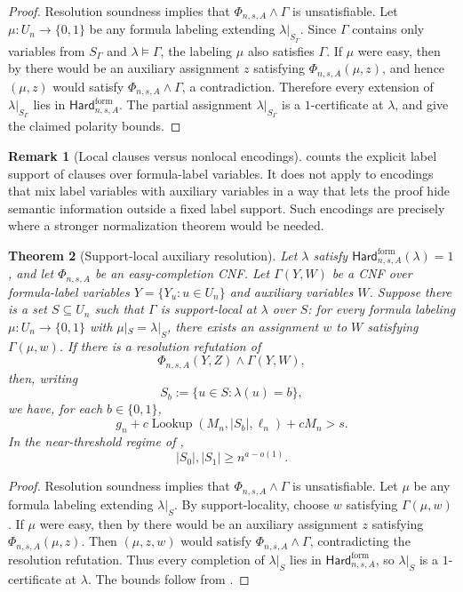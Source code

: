 \documentclass[11pt]{article}
\newtheorem{theorem}{Theorem}[section]
\theoremstyle{definition}
\newtheorem{remark}[theorem]{Remark}
\newcommand{\bits}{\{0,1\}}
\newcommand{\Lookup}{\operatorname{Lookup}}
\newcommand{\HardF}{\mathsf{Hard}^{\mathrm{form}}}
\begin{document}
\begin{proof}
Resolution soundness implies that \(\Phi_{n,s,A}\wedge\Gamma\) is unsatisfiable.  Let \(\mu:U_n\to\bits\) be any formula labeling extending \(\lambda|_{S_\Gamma}\).  Since \(\Gamma\) contains only variables from \(S_\Gamma\) and \(\lambda\models\Gamma\), the labeling \(\mu\) also satisfies \(\Gamma\).  If \(\mu\) were easy, then by  there would be an auxiliary assignment \(z\) satisfying \(\Phi_{n,s,A}(\mu,z)\), and hence \((\mu,z)\) would satisfy \(\Phi_{n,s,A}\wedge\Gamma\), a contradiction.  Therefore every extension of \(\lambda|_{S_\Gamma}\) lies in \(\HardF_{n,s,A}\).  The partial assignment \(\lambda|_{S_\Gamma}\) is a \(1\)-certificate at \(\lambda\), and  give the claimed polarity bounds.
\end{proof}

\begin{remark}[Local clauses versus nonlocal encodings]\label{rem:local-clause-scope}
 counts the explicit label support of clauses over formula-label variables.  It does not apply to encodings that mix label variables with auxiliary variables in a way that lets the proof hide semantic information outside a fixed label support.  Such encodings are precisely where a stronger normalization theorem would be needed.
\end{remark}

\begin{theorem}[Support-local auxiliary resolution]\label{thm:support-local-aux-resolution}
Let \(\lambda\) satisfy \(\HardF_{n,s,A}(\lambda)=1\), and let \(\Phi_{n,s,A}\) be an easy-completion CNF.  Let \(\Gamma(Y,W)\) be a CNF over formula-label variables \(Y=\{Y_u:u\in U_n\}\) and auxiliary variables \(W\).  Suppose there is a set \(S\subseteq U_n\) such that \(\Gamma\) is \emph{support-local at \(\lambda\) over \(S\)}: for every formula labeling \(\mu:U_n\to\bits\) with \(\mu|_S=\lambda|_S\), there exists an assignment \(w\) to \(W\) satisfying \(\Gamma(\mu,w)\).  If there is a resolution refutation of
\[
  \Phi_{n,s,A}(Y,Z)\wedge\Gamma(Y,W),
\]
then, writing
\[
  S_b:=\{u\in S:\lambda(u)=b\},
\]
we have, for each \(b\in\bits\),
\[
  g_n+c\Lookup(M_n,|S_b|,\ell_n)+cM_n>s.
\]
In the near-threshold regime of ,
\[
  |S_0|,|S_1|\ge n^{a-o(1)}.
\]
\end{theorem}

\begin{proof}
Resolution soundness implies that \(\Phi_{n,s,A}\wedge\Gamma\) is unsatisfiable.  Let \(\mu\) be any formula labeling extending \(\lambda|_S\).  By support-locality, choose \(w\) satisfying \(\Gamma(\mu,w)\).  If \(\mu\) were easy, then by  there would be an auxiliary assignment \(z\) satisfying \(\Phi_{n,s,A}(\mu,z)\).  Then \((\mu,z,w)\) would satisfy \(\Phi_{n,s,A}\wedge\Gamma\), contradicting the resolution refutation.  Thus every completion of \(\lambda|_S\) lies in \(\HardF_{n,s,A}\), so \(\lambda|_S\) is a \(1\)-certificate at \(\lambda\).  The bounds follow from .
\end{proof}
\end{document}
